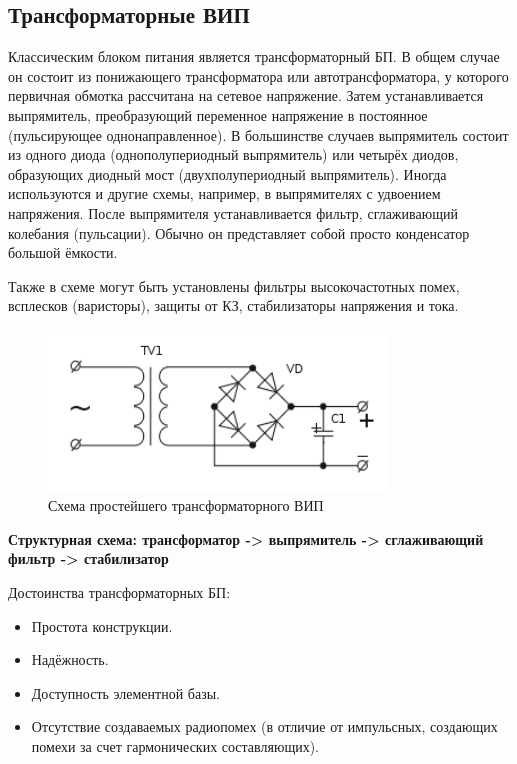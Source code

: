 \documentclass[unicode, 12pt, a4paper, oneside]{article}
\begin{document}
\subsection*{Трансформаторные ВИП}

Классическим блоком питания является трансформаторный БП. В общем случае он состоит из понижающего трансформатора или автотрансформатора, у которого первичная обмотка рассчитана на сетевое напряжение. Затем устанавливается выпрямитель, преобразующий переменное напряжение в постоянное (пульсирующее однонаправленное). В большинстве случаев выпрямитель состоит из одного диода (однополупериодный выпрямитель) или четырёх диодов, образующих диодный мост (двухполупериодный выпрямитель). Иногда используются и другие схемы, например, в выпрямителях с удвоением напряжения. После выпрямителя устанавливается фильтр, сглаживающий колебания (пульсации). Обычно он представляет собой просто конденсатор большой ёмкости.

Также в схеме могут быть установлены фильтры высокочастотных помех, всплесков (варисторы), защиты от КЗ, стабилизаторы напряжения и тока.

\begin{figure}[H]
\centering
\includegraphics[width=0.8\textwidth]{19_transformer.png}
\caption{Схема простейшего трансформаторного ВИП}
\label{fig:19_transformer}
\end{figure}

\textbf{Структурная схема: трансформатор -> выпрямитель -> сглаживающий фильтр -> стабилизатор}

Достоинства трансформаторных БП:

\begin{itemize}
\item Простота конструкции.
\item Надёжность.
\item Доступность элементной базы.
\item Отсутствие создаваемых радиопомех (в отличие от импульсных, создающих помехи за счет гармонических составляющих).
\end{itemize}
\end{document}
